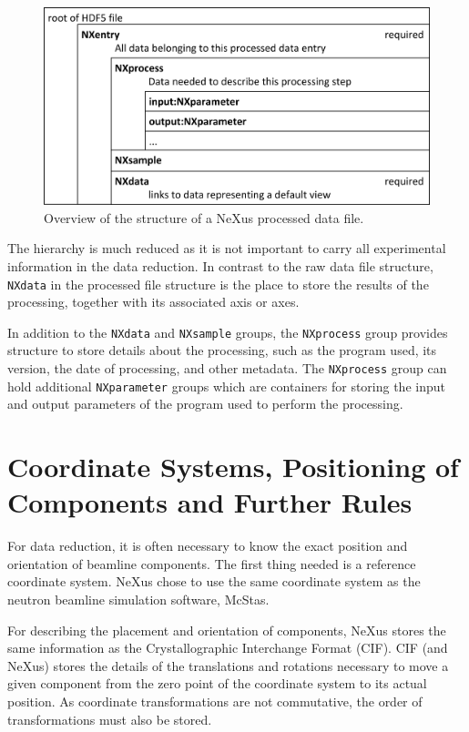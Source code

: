 \documentclass[%
 aip,
rsi,
 amsmath,amssymb,
 reprint,%
]{revtex4-1}
\begin{document}
\begin{figure}
\includegraphics[width=\columnwidth]{figure3}
\caption{\label{procfile}Overview of the structure of a NeXus processed data file.}
\end{figure}

The hierarchy is much reduced as it is not important to carry all experimental information in the data 
reduction. In contrast to the raw data file structure, \texttt{NXdata} in the processed file structure is the place 
to store the results of the processing, together with its associated axis or axes.

In addition to the \texttt{NXdata} and \texttt{NXsample} groups, 
the \texttt{NXprocess} group provides structure to store details 
about the processing, such as the program used, its version, 
the date of processing, and other metadata. 
The \texttt{NXprocess} group can hold additional \texttt{NXparameter} groups which are containers 
for storing the input and output parameters of the program used to perform the processing. 

\section{Coordinate Systems, Positioning of Components and Further Rules}

For data reduction, it is often necessary to know the exact position and orientation of beamline components. 
The first thing needed is a reference coordinate system. NeXus chose to use the same coordinate system as the 
neutron beamline simulation software, McStas\cite{mcstas}. 

For describing the placement and orientation of components, NeXus stores the same information as the 
Crystallographic Interchange Format (CIF)\cite{ITCVG}. CIF (and NeXus) stores the details 
of the translations and rotations necessary to move a given component from the zero point of the coordinate 
system to its actual position. As coordinate transformations are not commutative, the order of transformations 
must also be stored.
\end{document}
